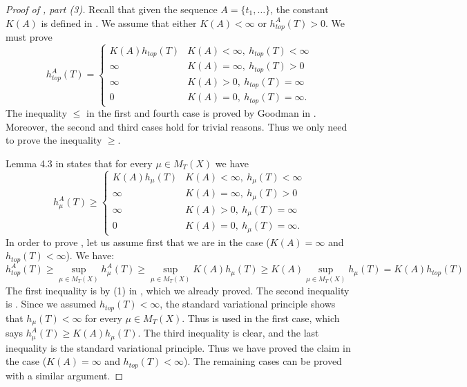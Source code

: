 \documentclass[a4paper,oneside]{amsart}
\renewcommand{\(}{\begin{dmath*}}
\renewcommand{\)}{\end{dmath*}}
\theoremstyle{definition}
\begin{document}
\begin{proof}[Proof of , part (3)]
    Recall that given the sequence $A=\{t_1,\dots\}$, the constant $K(A)$ is defined in 
. We assume that either $K(A)<\infty$ or $h^A_{top}(T)>0$. We must prove 
\begin{equation}\label{topological-krug-newton-2}
    h^A_{top}(T)= \begin{cases}
        K(A)h_{top}(T) &K(A)<\infty, \  h_{top}(T)<\infty\\
        \infty & K(A)=\infty, \ h_{top}(T)>0\\
        \infty & K(A)>0, \ h_{top}(T)=\infty\\
        0&  K(A)=0,  \ h_{top}(T)=\infty.
       \end{cases}
\end{equation}
The inequality $\leq$ in the first and fourth case is proved by Goodman in \cite[Lemma 4.2]{goodman_topological_1974}. Moreover, the second and third cases hold for trivial reasons. Thus we only need to prove the inequality $\geq$. 

Lemma 4.3 in \cite{goodman_topological_1974}	states that for every $\mu\in M_T(X)$ we have
\begin{equation}\label{krug-newton-2}
		h^{A}_{\mu}(T) \geq 
		\begin{cases}
			K(A)h_{\mu}(T) &K(A)<\infty, \  h_{\mu}(T)<\infty\\
			\infty & K(A)=\infty, \  h_{\mu}(T)>0\\
			\infty & K(A)>0, \  h_{\mu}(T)=\infty\\
			0&  K(A)=0,  \  h_{\mu}(T)=\infty.
		\end{cases}
\end{equation}
In order to prove , let us assume first that we are in the case ($K(A)=\infty$ and $h_{top}(T)<\infty$). We have: 
\(
h^A_{top}(T)\geq \sup _{\mu\in M_T(X)} h^{A}_{\mu}(T)
\geq \sup _{\mu\in M_T(X)}K(A)h_\mu(T) \geq K(A)\sup _{\mu\in M_T(X)}h_\mu(T)=K(A)h_{top}(T)
\)
The first inequality is by (1) in , which we already proved. The second inequality is . Since we assumed $h_{top}(T)<\infty$, the standard variational principle shows that $h_\mu(T)<\infty$ for every $\mu\in M_T(X)$.  Thus  is used in the first case, which says  $h^{A}_{\mu}(T)\geq K(A)h_{\mu}(T)$. The third inequality is clear, and the last inequality is the standard variational principle. Thus we have proved the claim in the case ($K(A)=\infty$ and $h_{top}(T)<\infty$). The remaining cases can be proved with a similar argument.
\end{proof}
\end{document}

